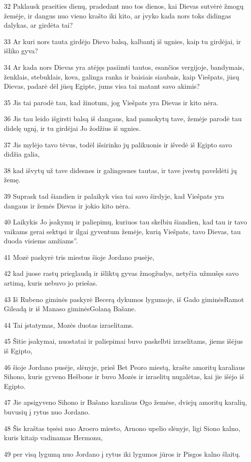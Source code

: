 \par 32 Paklausk praeities dienų, pradedant nuo tos dienos, kai Dievas sutvėrė žmogų žemėje, ir dangus nuo vieno krašto iki kito, ar įvyko kada nors toks didingas dalykas, ar girdėta tai? 
\par 33 Ar kuri nors tauta girdėjo Dievo balsą, kalbantį iš ugnies, kaip tu girdėjai, ir išliko gyva? 
\par 34 Ar kada nors Dievas yra atėjęs pasiimti tautos, esančios vergijoje, bandymais, ženklais, stebuklais, kova, galinga ranka ir baisiais siaubais, kaip Viešpats, jūsų Dievas, padarė dėl jūsų Egipte, jums visa tai matant savo akimis? 
\par 35 Jis tai parodė tau, kad žinotum, jog Viešpats yra Dievas ir kito nėra. 
\par 36 Jis tau leido išgirsti balsą iš dangaus, kad pamokytų tave, žemėje parodė tau didelę ugnį, ir tu girdėjai Jo žodžius iš ugnies. 
\par 37 Jis mylėjo tavo tėvus, todėl išsirinko jų palikuonis ir išvedė iš Egipto savo didžia galia, 
\par 38 kad išvytų už tave didesnes ir galingesnes tautas, ir tave įvestų paveldėti jų žemę. 
\par 39 Suprask tad šiandien ir palaikyk visa tai savo širdyje, kad Viešpats yra dangaus ir žemės Dievas ir jokio kito nėra. 
\par 40 Laikykis Jo įsakymų ir paliepimų, kuriuos tau skelbiu šiandien, kad tau ir tavo vaikams gerai sektųsi ir ilgai gyventum žemėje, kurią Viešpats, tavo Dievas, tau duoda visiems amžiams”. 
\par 41 Mozė paskyrė tris miestus šioje Jordano pusėje, 
\par 42 kad juose rastų prieglaudą ir išliktų gyvas žmogžudys, netyčia užmušęs savo artimą, kuris nebuvo jo priešas. 
\par 43 Iš Rubeno giminės paskyrė Becerą dykumos lygumoje, iš Gado giminės­Ramot Gileadą ir iš Manaso giminės­Golaną Bašane. 
\par 44 Tai įstatymas, Mozės duotas izraelitams. 
\par 45 Šitie įsakymai, nuostatai ir paliepimai buvo paskelbti izraelitams, jiems išėjus iš Egipto, 
\par 46 šioje Jordano pusėje, slėnyje, prieš Bet Peoro miestą, krašte amoritų karaliaus Sihono, kuris gyveno Hešbone ir buvo Mozės ir izraelitų nugalėtas, kai jie išėjo iš Egipto. 
\par 47 Jie apsigyveno Sihono ir Bašano karaliaus Ogo žemėse, dviejų amoritų karalių, buvusių į rytus nuo Jordano. 
\par 48 Šis kraštas tęsėsi nuo Aroero miesto, Arnono upelio slėnyje, ligi Siono kalno, kuris kitaip vadinamas Hermonu, 
\par 49 per visą lygumą nuo Jordano į rytus iki lygumos jūros ir Pisgos kalno šlaitų.



